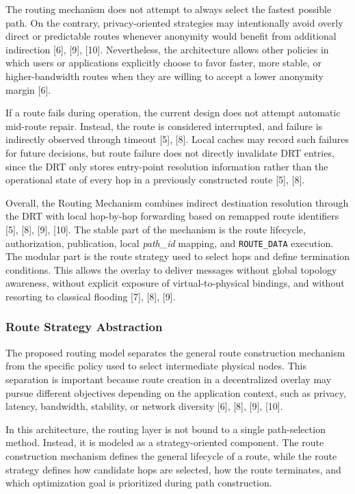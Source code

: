 \documentclass[12pt,a4paper]{article}
\begin{document}
The routing mechanism does not attempt to always select the fastest possible path. On the contrary, privacy-oriented strategies may intentionally avoid overly direct or predictable routes whenever anonymity would benefit from additional indirection [6], [9], [10]. Nevertheless, the architecture allows other policies in which users or applications explicitly choose to favor faster, more stable, or higher-bandwidth routes when they are willing to accept a lower anonymity margin [6].

If a route fails during operation, the current design does not attempt automatic mid-route repair. Instead, the route is considered interrupted, and failure is indirectly observed through timeout [5], [8]. Local caches may record such failures for future decisions, but route failure does not directly invalidate DRT entries, since the DRT only stores entry-point resolution information rather than the operational state of every hop in a previously constructed route [5], [8].

Overall, the Routing Mechanism combines indirect destination resolution through the DRT with local hop-by-hop forwarding based on remapped route identifiers [5], [8], [9], [10]. The stable part of the mechanism is the route lifecycle, authorization, publication, local \textit{path\_id} mapping, and \texttt{ROUTE\_DATA} execution. The modular part is the route strategy used to select hops and define termination conditions. This allows the overlay to deliver messages without global topology awareness, without explicit exposure of virtual-to-physical bindings, and without resorting to classical flooding [7], [8], [9].

\subsubsection{Route Strategy Abstraction}
\label{subsubsec:route-strategy-abstraction}

The proposed routing model separates the general route construction mechanism from
the specific policy used to select intermediate physical nodes. This separation is
important because route creation in a decentralized overlay may pursue different
objectives depending on the application context, such as privacy, latency, bandwidth,
stability, or network diversity [6], [8], [9], [10].

In this architecture, the routing layer is not bound to a single path-selection method.
Instead, it is modeled as a strategy-oriented component. The route construction
mechanism defines the general lifecycle of a route, while the route strategy defines how
candidate hops are selected, how the route terminates, and which optimization goal is
prioritized during path construction.
\end{document}
